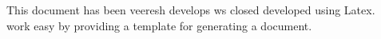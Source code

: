 \begin{abstracts}
\normalsize{
This document has been veeresh develops ws closed developed using Latex. \\

work easy by providing a template for generating a document.
}
\end{abstracts}


